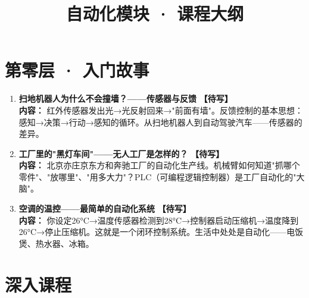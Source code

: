\documentclass[a4paper,11pt]{ctexart}
\title{\textcolor{blue!70!black}{\Huge\textbf{自动化模块 · 课程大纲}}}
\author{}
\date{}
\newcommand{\draft}{\textcolor{orange!80!black}{\textbf{【待写】}}}
\begin{document}
\maketitle
\thispagestyle{empty}

\section*{第零层 · 入门故事}

\begin{enumerate}
\item[\textbf{第1课}] \textbf{扫地机器人为什么不会撞墙？——传感器与反馈} \draft \\
\textbf{内容：} 红外传感器发出光→光反射回来→"前面有墙"。反馈控制的基本思想：感知→决策→行动→感知的循环。从扫地机器人到自动驾驶汽车——传感器的差异。
\item[\textbf{第2课}] \textbf{工厂里的"黑灯车间"——无人工厂是怎样的？} \draft \\
\textbf{内容：} 北京亦庄京东方和奔驰工厂的自动化生产线。机械臂如何知道"抓哪个零件"、"放哪里"、"用多大力"？PLC（可编程逻辑控制器）是工厂自动化的"大脑"。
\item[\textbf{第3课}] \textbf{空调的温控——最简单的自动化系统} \draft \\
\textbf{内容：} 你设定26°C→温度传感器检测到28°C→控制器启动压缩机→温度降到26°C→停止压缩机。这就是一个闭环控制系统。生活中处处是自动化——电饭煲、热水器、冰箱。
\end{enumerate}

\section*{深入课程}
\end{document}
